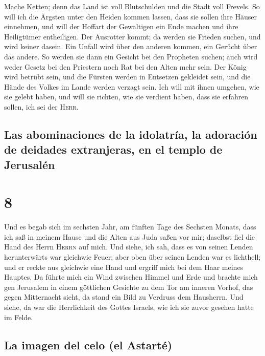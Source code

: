  Mache Ketten; denn das Land ist voll Blutschulden und
die Stadt voll Frevels.  So will ich die Ärgsten unter
den Heiden kommen lassen, dass sie sollen ihre Häuser einnehmen, und
will der Hoffart der Gewaltigen ein Ende machen und ihre Heiligtümer
entheiligen.  Der Ausrotter kommt; da werden sie Frieden
suchen, und wird keiner dasein.  Ein Unfall wird über den
anderen kommen, ein Gerücht über das andere. So werden sie dann ein
Gesicht bei den Propheten suchen; auch wird weder Gesetz bei den
Priestern noch Rat bei den Alten mehr sein.  Der König
wird betrübt sein, und die Fürsten werden in Entsetzen gekleidet sein,
und die Hände des Volkes im Lande werden verzagt sein. Ich will mit
ihnen umgehen, wie sie gelebt haben, und will sie richten, wie sie
verdient haben, dass sie erfahren sollen, ich sei der \textsc{Herr}.

\hypertarget{las-abominaciones-de-la-idolatruxeda-la-adoraciuxf3n-de-deidades-extranjeras-en-el-templo-de-jerusaluxe9n}{%
\subsection{Las abominaciones de la idolatría, la adoración de deidades
extranjeras, en el templo de
Jerusalén}\label{las-abominaciones-de-la-idolatruxeda-la-adoraciuxf3n-de-deidades-extranjeras-en-el-templo-de-jerusaluxe9n}}

\hypertarget{section-7}{%
\section{8}\label{section-7}}

 Und es begab sich im sechsten Jahr, am fünften Tage des
Sechsten Monats, dass ich saß in meinem Hause und die Alten aus Juda
saßen vor mir; daselbst fiel die Hand des Herrn \textsc{Herrn} auf mich.
 Und siehe, ich sah, dass es von seinen Lenden
herunterwärts war gleichwie Feuer; aber oben über seinen Lenden war es
lichthell;  und er reckte aus gleichwie eine Hand und
ergriff mich bei dem Haar meines Hauptes. Da führte mich ein Wind
zwischen Himmel und Erde und brachte mich gen Jerusalem in einem
göttlichen Gesichte zu dem Tor am inneren Vorhof, das gegen Mitternacht
sieht, da stand ein Bild zu Verdruss dem Hausherrn.  Und
siehe, da war die Herrlichkeit des Gottes Israels, wie ich sie zuvor
gesehen hatte im Felde.

\hypertarget{la-imagen-del-celo-el-astartuxe9}{%
\subsection{La imagen del celo (el
Astarté)}\label{la-imagen-del-celo-el-astartuxe9}}

